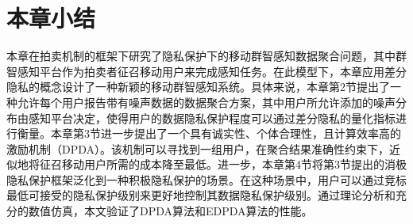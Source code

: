 \section{本章小结}\label{sec:toncon}
本章在拍卖机制的框架下研究了隐私保护下的移动群智感知数据聚合问题，其中群智感知平台作为拍卖者征召移动用户来完成感知任务。在此模型下，本章应用差分隐私的概念设计了一种新颖的移动群智感知系统。具体来说，本章第2节提出了一种允许每个用户报告带有噪声数据的数据聚合方案，其中用户所允许添加的噪声分布由感知平台决定，使得用户的数据隐私保护程度可以通过差分隐私的量化指标进行衡量。本章第3节进一步提出了一个具有诚实性、个体合理性，且计算效率高的激励机制（DPDA）。该机制可以寻找到一组用户，在聚合结果准确性约束下，近似地将征召移动用户所需的成本降至最低。进一步，本章第4节将第3节提出的消极隐私保护框架泛化到一种积极隐私保护的场景。在这种场景中，用户可以通过竞标最低可接受的隐私保护级别来更好地控制其数据隐私保护级别。通过理论分析和充分的数值仿真，本文验证了DPDA算法和EDPDA算法的性能。

